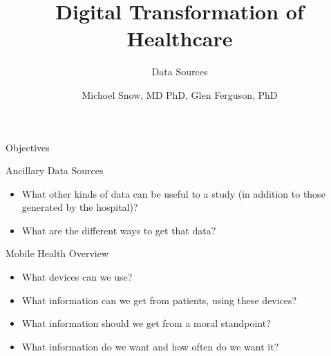\documentclass[10pt, xcolor=table]{beamer}
\title{Digital Transformation of Healthcare}
\subtitle{Data Sources}
\date{}
\author{Michoel Snow, MD PhD, Glen Ferguson, PhD}
\institute{Center for Health Data Innovations}
\begin{document}
\maketitle

\begin{frame}{Objectives}

\end{frame}

\begin{frame}{Ancillary Data Sources}
	\begin{itemize}[<+(0)->]
		\item What other kinds of data can be useful to a study (in addition to those generated by the hospital)?
		\item What are the different ways to get that data?
	\end{itemize}
\end{frame}





\begin{frame}{Mobile Health Overview }
	\begin{itemize}[<+(0)->]
		\item What devices can we use?
		\item What information can we get from patients, using these devices?
		\item What information should we get from a moral standpoint?
		\item What information do we want and how often do we want it?
	\end{itemize}
\end{frame}
\end{document}
